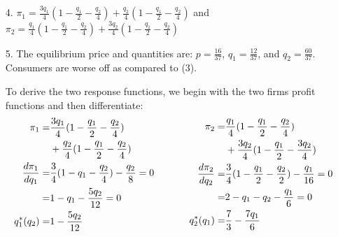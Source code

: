 \documentclass{article}
\newenvironment{solution}{\color{red}}{\color{black}}
\begin{document}
\begin{solution}
\begin{enumerate}
\item[4.] $\pi_{1} = \frac{3q_{1}}{4}(1-\frac{q_{1}}{2}-\frac{q_{2}}{4}) + \frac{q_{2}}{4}(1-\frac{q_{1}}{2} - \frac{q_{2}}{4})$  and 
\\
$\pi_{2} = \frac{q_{1}}{4}(1-\frac{q_{1}}{2}-\frac{q_{2}}{4}) + \frac{3q_{2}}{4}(1-\frac{q_{1}}{2} - \frac{q_{2}}{4} )$
\\

\item[5.] The equilibrium price and quantities are: $p=\frac{16}{37}$, $q_{1} = \frac{12}{37}$, and $q_{2} = \frac{60}{37}$. Consumers are worse off as compared to (3).

To derive the two response functions, we begin with the two firms profit functions and then differentiate:
\begin{equation*}
\begin{aligned}
\pi_{1} =& \frac{3q_{1}}{4}(1-\frac{q_{1}}{2}-\frac{q_{2}}{4}) \\ &+ \frac{q_{2}}{4}(1-\frac{q_{1}}{2} - \frac{q_{2}}{4} ) \\
\frac{d \pi_{1}}{d q_{1}} =& \frac{3}{4}(1-q_{1}-\frac{q_{2}}{4}) - \frac{q_{2}}{8} = 0 \\
=& 1 - q_{1} - \frac{5q_{2}}{12} = 0 \\
q^{*}_{1}(q_{2}) =& 1 - \frac{5q_{2}}{12} \\
\end{aligned}
\hspace{.5in}
\begin{aligned}
\pi_{2} =& \frac{q_{1}}{4}(1-\frac{q_{1}}{2}-\frac{q_{2}}{4}) \\
&+ \frac{3q_{2}}{4}(1-\frac{q_{1}}{2} - \frac{3q_{2}}{4} ) \\
\frac{d \pi_{2}}{d q_{2}} =& \frac{3}{4}(1-\frac{q_{1}}{2}- \frac{q_{2}}{2}) - \frac{q_{1}}{16} = 0\\
=& 2 - q_{1} - q_{2} -  \frac{q_{1}}{6} = 0\\
q^{*}_{2}(q_{1}) =&  \frac{7}{3} - \frac{7q_{1}}{6} \\
\end{aligned}
\end{equation*}


\end{enumerate}
\end{solution}
\end{document}
